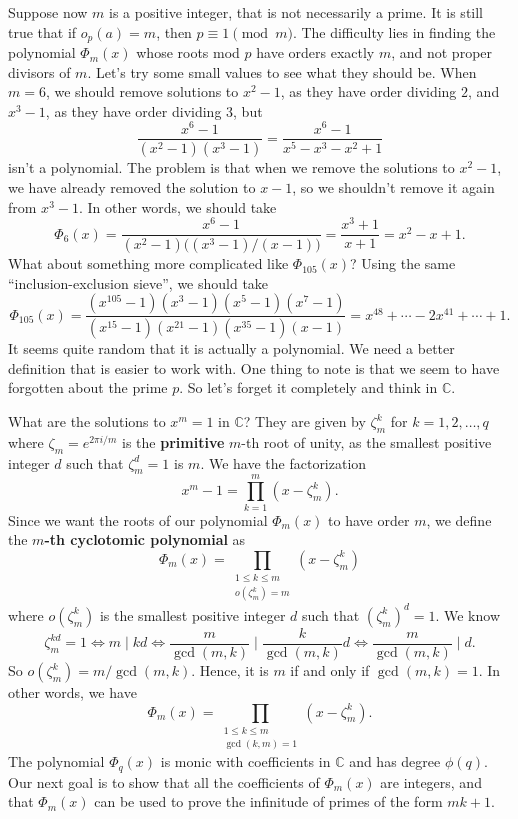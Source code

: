 \documentclass{article}
\def\C{{\mathbb C}}
\begin{document}
Suppose now $m$ is a positive integer, that is not necessarily a prime. It is still true that if $o_p(a) = m$, then $p\equiv 1\pmod{m}$. The difficulty lies in finding the polynomial $\Phi_m(x)$ whose roots mod $p$ have orders exactly $m$, and not proper divisors of $m$. Let's try some small values to see what they should be. When $m = 6$, we should remove solutions to $x^2-1$, as they have order dividing $2$, and $x^3 - 1$, as they have order dividing $3$, but $$\frac{x^6-1}{(x^2-1)(x^3 - 1)} = \frac{x^6-1}{x^5 - x^3 - x^2 + 1}$$
isn't a polynomial. The problem is that when we remove the solutions to $x^2 - 1$, we have already removed the solution to $x - 1$, so we shouldn't remove it again from $x^3 - 1$. In other words, we should take
$$\Phi_6(x) = \frac{x^6 - 1}{(x^2 - 1)\big((x^3 - 1)/(x-1)\big)} = \frac{x^3 + 1}{x + 1} = x^2 - x + 1.$$
What about something more complicated like $\Phi_{105}(x)$? Using the same ``inclusion-exclusion sieve'', we should take
$$\Phi_{105}(x) = \frac{(x^{105}-1)(x^3-1)(x^5-1)(x^7-1)}{(x^{15}-1)(x^{21}-1)(x^{35}-1)(x-1)} = x^{48} + \cdots - 2x^{41} + \cdots + 1.$$
It seems quite random that it is actually a polynomial. We need a better definition that is easier to work with. One thing to note is that we seem to have forgotten about the prime $p$. So let's forget it completely and think in $\C$.

What are the solutions to $x^m = 1$ in $\C$? They are given by $\zeta_m^k$ for $k = 1,2,\ldots, q$ where $\zeta_m = e^{2\pi i/m}$ is the \textbf{primitive} $m$-th root of unity, as the smallest positive integer $d$ such that $\zeta_m^d = 1$ is $m$. We have the factorization 
$$x^m - 1 = \prod_{k=1}^m (x - \zeta_m^k).$$
Since we want the roots of our polynomial $\Phi_m(x)$ to have order $m$, we define the \textbf{$m$-th cyclotomic polynomial} as
$$\Phi_m(x) = \prod_{\substack{1\leq k\leq m\\ o(\zeta_m^k) = m}}(x - \zeta_m^k)$$
where $o(\zeta_m^k)$ is the smallest positive integer $d$ such that $(\zeta_m^k)^d = 1$. We know
$$\zeta_m^{kd} = 1 \Leftrightarrow m\mid kd \Leftrightarrow \frac{m}{\gcd(m,k)}\mid\frac{k}{\gcd(m,k)}d\Leftrightarrow \frac{m}{\gcd(m,k)}\mid d.$$
So $o(\zeta_m^k) = m/\gcd(m,k).$ Hence, it is $m$ if and only if $\gcd(m,k) = 1$. In other words, we have
$$\Phi_m(x) = \prod_{\substack{1\leq k\leq m\\ \gcd(k,m)=1}}(x - \zeta_m^k).$$
 The polynomial $\Phi_q(x)$ is monic with coefficients in $\C$ and has degree $\phi(q)$. Our next goal is to show that all the coefficients of $\Phi_m(x)$ are integers, and that $\Phi_m(x)$ can be used to prove the infinitude of primes of the form $mk + 1$.
 
\end{document}
